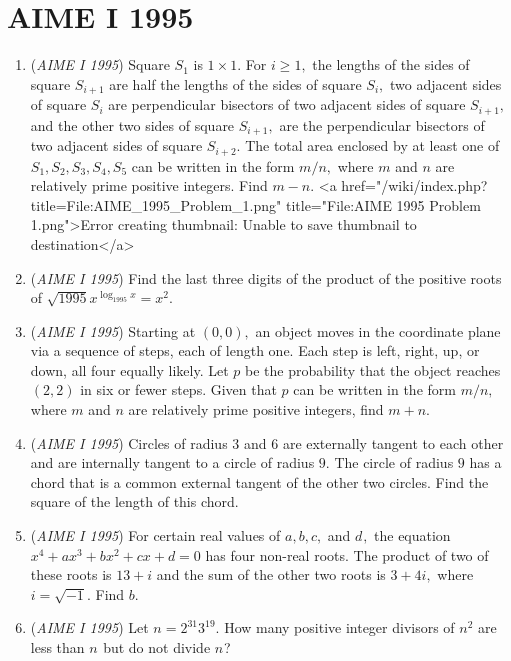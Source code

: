 \section{AIME I 1995}
        \begin{enumerate}
        	\item (\textit{AIME I 1995}) Square $S_{1}$ is $1\times 1.$  For $i\ge 1,$ the lengths of the sides of square $S_{i+1}$ are half the lengths of the sides of square $S_{i},$ two adjacent sides of square $S_{i}$ are perpendicular bisectors of two adjacent sides of square $S_{i+1},$ and the other two sides of square $S_{i+1},$ are the perpendicular bisectors of two adjacent sides of square $S_{i+2}.$  The total area enclosed by at least one of $S_{1}, S_{2}, S_{3}, S_{4}, S_{5}$ can be written in the form $m/n,$ where $m$ and $n$ are relatively prime positive integers.  Find $m-n.$
<a href="/wiki/index.php?title=File:AIME\_1995\_Problem\_1.png" title="File:AIME 1995 Problem 1.png">Error creating thumbnail: Unable to save thumbnail to destination</a>


	\item (\textit{AIME I 1995}) Find the last three digits of the product of the positive roots of
$\sqrt{1995}x^{\log_{1995}x}=x^2.$


	\item (\textit{AIME I 1995}) Starting at $(0,0),$ an object moves in the coordinate plane via a sequence of steps, each of length one.  Each step is left, right, up, or down, all four equally likely.  Let $p$ be the probability that the object reaches $(2,2)$ in six or fewer steps.  Given that $p$ can be written in the form $m/n,$ where $m$ and $n$ are relatively prime positive integers, find $m+n.$


	\item (\textit{AIME I 1995}) Circles of radius $3$ and $6$ are externally tangent to each other and are internally tangent to a circle of radius $9$. The circle of radius $9$ has a chord that is a common external tangent of the other two circles. Find the square of the length of this chord.


 

	\item (\textit{AIME I 1995}) For certain real values of $a, b, c,$ and $d_{},$  the equation $x^4+ax^3+bx^2+cx+d=0$ has four non-real roots.  The product of two of these roots is $13+i$ and the sum of the other two roots is $3+4i,$ where $i=\sqrt{-1}.$  Find $b.$


	\item (\textit{AIME I 1995}) Let $n=2^{31}3^{19}.$  How many positive integer divisors of $n^2$ are less than $n_{}$ but do not divide $n_{}$?



\end{enumerate}
